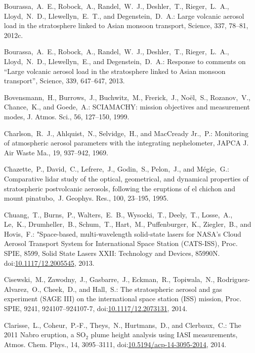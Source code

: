 \documentclass[amtd, online, hvmath]{copernicus}
\begin{document}
\begin{thebibliography}{99}
Bourassa,~A.~E., Robock,~A., Randel,~W.~J., Deshler,~T.,
  Rieger,~L.~A., Lloyd,~N.~D., Llewellyn,~E.~T., and
  Degenstein,~D.~A.: Large volcanic aerosol load in the stratosphere
  linked to Asian monsoon transport, Science, 337, 78--81,
  2012c.


Bourassa,~A.~E., Robock,~A., Randel,~W.~J., Deshler,~T., Rieger,~L.~A.,
Lloyd,~N.~D., Llewellyn,~E., and Degenstein,~D.~A.: Response to comments on
``Large volcanic aerosol load in the stratosphere linked to Asian monsoon
transport'', Science, 339, 647--647, 2013.


Bovensmann,~H., Burrows,~J., Buchwitz,~M., Frerick,~J., No\"{e}l,~S.,
Rozanov,~V., Chance,~K., and Goede,~A.: SCIAMACHY: mission objectives and
measurement modes, J. Atmos. Sci., 56, 127--150, 1999.


Charlson,~R.~J., Ahlquist,~N., Selvidge,~H., and MacCready Jr.,~P.:
Monitoring of atmospheric aerosol parameters with the integrating
nephelometer, JAPCA J. Air Waste Ma., 19, 937--942, 1969.


Chazette,~P., David,~C., Lefrere,~J., Godin,~S., Pelon,~J., and
M\'{e}gie,~G.: Comparative lidar study of the optical, geometrical, and
dynamical properties of stratospheric postvolcanic aerosols, following the
eruptions of el chichon and mount pinatubo,~J. Geophys. Res., 100, 23--195,
1995.

Chuang,~T., Burns,~P., Walters,~E.~B., Wysocki,~T., Deely,~T., Losse,~A., Le,~K.,
Drumheller,~B., Schum,~T., Hart,~M., Puffenburger,~K., Ziegler,~B., and Hovis,~F.:
"Space-based, multi-wavelength solid-state lasers for NASA's Cloud Aerosol Transport
System for International Space Station (CATS-ISS), Proc. SPIE, 8599, Solid State Lasers XXII:
Technology and Devices, 85990N. doi:\href{http://dx.doi.org/10.1117/12.2005545}{10.1117/12.2005545}, 2013.

Cisewski,~M., Zawodny,~J., Gasbarre,~J., Eckman,~R., Topiwala,~N.,
Rodriguez-Alvarez,~O., Cheek,~D., and Hall,~S.: The stratospheric aerosol and
gas experiment (SAGE III) on the international space station (ISS) mission,
Proc. SPIE, 9241, 924107--924107-7,
doi:\href{http://dx.doi.org/10.1117/12.2073131}{10.1117/12.2073131}, 2014.


Clarisse,~L., Coheur,~P.-F., Theys,~N., Hurtmans,~D., and Clerbaux,~C.: The
2011 Nabro eruption, a SO$_{2}$ plume height analysis using IASI
measurements, Atmos. Chem. Phys., 14, 3095--3111,
doi:\href{http://dx.doi.org/10.5194/acp-14-3095-2014}{10.5194/acp-14-3095-2014},
2014.




\end{thebibliography}
\end{document}

